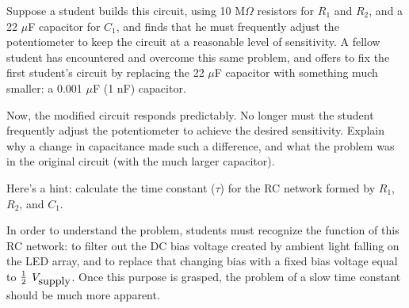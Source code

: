 

Suppose a student builds this circuit, using 10 M$\Omega$ resistors for $R_1$ and $R_2$, and a 22 $\mu$F capacitor for $C_1$, and finds that he must frequently adjust the potentiometer to keep the circuit at a reasonable level of sensitivity.  A fellow student has encountered and overcome this same problem, and offers to fix the first student's circuit by replacing the 22 $\mu$F capacitor with something much smaller: a 0.001 $\mu$F (1 nF) capacitor.

Now, the modified circuit responds predictably.  No longer must the student frequently adjust the potentiometer to achieve the desired sensitivity.  Explain why a change in capacitance made such a difference, and what the problem was in the original circuit (with the much larger capacitor).







Here's a hint: calculate the time constant ($\tau$) for the RC network formed by $R_1$, $R_2$, and $C_1$.







In order to understand the problem, students must recognize the function of this RC network: to filter out the DC bias voltage created by ambient light falling on the LED array, and to replace that changing bias with a fixed bias voltage equal to $1 \over 2$ $V_{\hbox{supply}}$.  Once this purpose is grasped, the problem of a slow time constant should be much more apparent.



